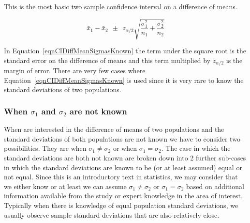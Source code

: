 This is the most basic two sample confidence interval on a difference of means.

\begin{termBox}{
\begin{equation}
\bar{x}_{1} - \bar{x}_{2}	~~ \pm ~~		z_{\alpha / 2}  \sqrt{ \frac{\sigma_1^2}{n_1} + \frac{\sigma_2^2}{n_2} }\label{eqnCIDiffMeanSigmasKnown}
\end{equation}
}
\end{termBox}

In Equation~\eqref{eqnCIDiffMeanSigmasKnown} 
the term under the square root
is the standard error on the difference of means and
this term multiplied by $z_{\alpha/2}$
is the margin of error.
There are very few cases where Equation~\eqref{eqnCIDiffMeanSigmasKnown} is used
since it is very rare to know the standard deviations of two populations.




\subsubsection{When $\sigma_{1}$ and $\sigma_{2}$ are not known}

When are interested in the difference of means of two populations and the
standard deviations of both populations are not known we have to consider two possibilities.
They are when $\sigma_{1} \neq \sigma_{2}$ or when $\sigma_{1} = \sigma_{2}$.
%
The case in which the standard deviations are both not known are broken down into 2 further
sub-cases in which the standard deviations are known to be (or at least assumed) equal or not equal.
Since this is an introductory text in statistics, we may consider that we either know or at least we can assume 
$\sigma_{1} \neq \sigma_{2}$ or $\sigma_{1} = \sigma_{2}$ based on 
additional information available from the study or expert knowledge in the area of interest.
Typically when there is knowledge of equal population standard deviations,
we usually observe sample standard deviations that are also relatively close.

